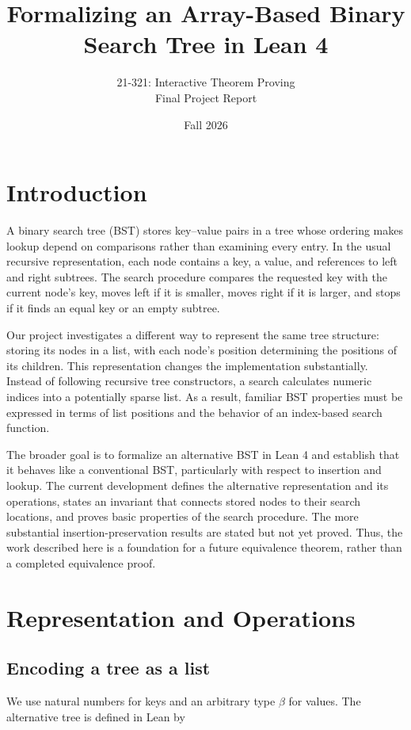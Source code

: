 \documentclass[10pt]{article}
\title{Formalizing an Array-Based Binary Search Tree in Lean 4}
\author{21-321: Interactive Theorem Proving\\Final Project Report}
\date{Fall 2026}
\begin{document}
\maketitle

\section{Introduction}

A binary search tree (BST) stores key--value pairs in a tree whose ordering makes lookup depend on comparisons rather than examining every entry. In the usual recursive representation, each node contains a key, a value, and references to left and right subtrees. The search procedure compares the requested key with the current node's key, moves left if it is smaller, moves right if it is larger, and stops if it finds an equal key or an empty subtree.

Our project investigates a different way to represent the same tree structure: storing its nodes in a list, with each node's position determining the positions of its children. This representation changes the implementation substantially. Instead of following recursive tree constructors, a search calculates numeric indices into a potentially sparse list. As a result, familiar BST properties must be expressed in terms of list positions and the behavior of an index-based search function.

The broader goal is to formalize an alternative BST in Lean 4 and establish that it behaves like a conventional BST, particularly with respect to insertion and lookup. The current development defines the alternative representation and its operations, states an invariant that connects stored nodes to their search locations, and proves basic properties of the search procedure. The more substantial insertion-preservation results are stated but not yet proved. Thus, the work described here is a foundation for a future equivalence theorem, rather than a completed equivalence proof.

\section{Representation and Operations}

\subsection{Encoding a tree as a list}

We use natural numbers for keys and an arbitrary type $\beta$ for values. The alternative tree is defined in Lean by
\end{document}
